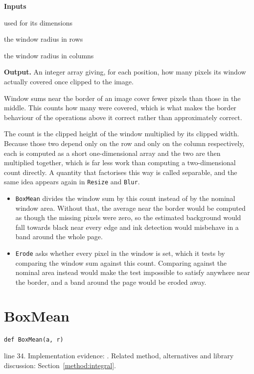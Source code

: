 \noindent\textbf{Inputs}
\begin{description}[leftmargin=2.2em,style=nextline,font=\normalfont\ttfamily]\setlength\itemsep{1pt}
  \item[{shape or array}] \normalfont used for its dimensions
  \item[{ry}] \normalfont the window radius in rows
  \item[{rx}] \normalfont the window radius in columns
\end{description}

\noindent\textbf{Output.} An integer array giving, for each position, how many pixels its window actually covered once clipped to the image.


Window sums near the border of an image cover fewer pixels than those in the middle. This counts how many were covered, which is what makes the border behaviour of the operations above it correct rather than approximately correct.


The count is the clipped height of the window multiplied by its clipped width. Because those two depend only on the row and only on the column respectively, each is computed as a short one-dimensional array and the two are then multiplied together, which is far less work than computing a two-dimensional count directly. A quantity that factorises this way is called separable, and the same idea appears again in \texttt{Resize} and \texttt{Blur}.



\begin{itemize}\setlength\itemsep{0pt}
  \item \texttt{BoxMean} divides the window sum by this count instead of by the nominal window area. Without that, the average near the border would be computed as though the missing pixels were zero, so the estimated background would fall towards black near every edge and ink detection would misbehave in a band around the whole page.
  \item \texttt{Erode} asks whether every pixel in the window is set, which it tests by comparing the window sum against this count. Comparing against the nominal area instead would make the test impossible to satisfy anywhere near the border, and a band around the page would be eroded away.
\end{itemize}


\section{BoxMean}\label{fn:segment:BoxMean}
\begin{lstlisting}[style=sig]
def BoxMean(a, r)
\end{lstlisting}
 line 34. Implementation evidence: \cite{code2026}. Related method, alternatives and library discussion: Section~\ref{method:integral}.


